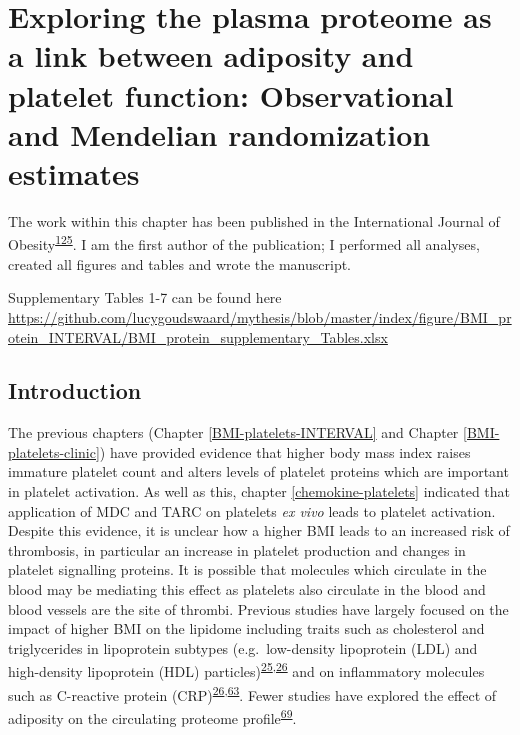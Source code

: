 \documentclass[11pt,twoside]{bristolthesis}
\begin{document}
\hypertarget{BMI-protein-MR}{%
\chapter{Exploring the plasma proteome as a link between adiposity and platelet function: Observational and Mendelian randomization estimates}\label{BMI-protein-MR}}

The work within this chapter has been published in the International Journal of Obesity\textsuperscript{\protect\hyperlink{ref-Goudswaard2021}{125}}. I am the first author of the publication; I performed all analyses, created all figures and tables and wrote the manuscript.

Supplementary Tables 1-7 can be found here \url{https://github.com/lucygoudswaard/mythesis/blob/master/index/figure/BMI_protein_INTERVAL/BMI_protein_supplementary_Tables.xlsx}

\hypertarget{introduction-1}{%
\section{Introduction}\label{introduction-1}}

The previous chapters (Chapter \ref{BMI-platelets-INTERVAL} and Chapter \ref{BMI-platelets-clinic}) have provided evidence that higher body mass index raises immature platelet count and alters levels of platelet proteins which are important in platelet activation. As well as this, chapter \ref{chemokine-platelets} indicated that application of MDC and TARC on platelets \emph{ex vivo} leads to platelet activation. Despite this evidence, it is unclear how a higher BMI leads to an increased risk of thrombosis, in particular an increase in platelet production and changes in platelet signalling proteins. It is possible that molecules which circulate in the blood may be mediating this effect as platelets also circulate in the blood and blood vessels are the site of thrombi. Previous studies have largely focused on the impact of higher BMI on the lipidome including traits such as cholesterol and triglycerides in lipoprotein subtypes (e.g.~low-density lipoprotein (LDL) and high-density lipoprotein (HDL) particles)\textsuperscript{\protect\hyperlink{ref-Bell2018a}{25},\protect\hyperlink{ref-Wurtz2014}{26}} and on inflammatory molecules such as C-reactive protein (CRP)\textsuperscript{\protect\hyperlink{ref-Wurtz2014}{26},\protect\hyperlink{ref-Timpson2011}{63}}. Fewer studies have explored the effect of adiposity on the circulating proteome profile\textsuperscript{\protect\hyperlink{ref-Cominetti2018}{69}}.
\end{document}
